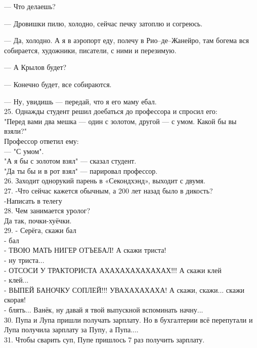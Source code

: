 \documentclass[a4paper,20pt,notitlepage]{extbook}
\begin{document}
	— Что делаешь?
	
	— Дровишки пилю, холодно, сейчас печку затоплю и согреюсь.
	
	— Да, холодно. А я в аэропорт еду, полечу в Рио–де–Жанейро, там богема вся собирается, художники, писатели, с ними и перезимую.
	
	— А Крылов будет?
	
	— Конечно будет, все собираются.
	
	— Ну, увидишь — передай, что я его маму ебал.\\
	
	25.	Однажды студент решил доебаться до профессора и спросил его: \\
	"Перед вами два мешка — один с золотом, другой — с умом. Какой бы вы взяли?"\\
	Профессор ответил ему:\\
	 — "С умом".\\
	"А я бы с золотом взял" — сказал студент.\\
	"Да ты бы и в рот взял" — парировал профессор.\\
	
	26. Заходит однорукий парень в «Секондхэнд», выходит с двумя. \\ 
	
	27. -Что сейчас кажется обычным, а 200 лет назад было в дикость?\\
		-Написать в телегу\\
		
	28. Чем занимается уролог?\\
		Да так, почки-хуёчки.\\
		
	29. - Серёга, скажи бал\\
	- бал\\
	- ТВОЮ МАТЬ НИГЕР ОТЪЕБАЛ! А скажи триста!\\
	- ну триста...\\
	- ОТСОСИ У ТРАКТОРИСТА АХАХАХАХАХАХАХ!!! А скажи клей\\
	- клей...\\
	- ВЫПЕЙ БАНОЧКУ СОПЛЕЙ!!! УВАХАХАХАХА! А скажи, скажи... скажи скорая!\\
	- блять... Ванёк, ну давай я твой выпускной вспоминать начну...\\
	
	30. Пупа и Лупа пришли получать зарплату. Но в бухгалтерии всё перепутали и Лупа получила зарплату за Пупу, а Пупа....\\
	
	31. Чтобы сварить суп, Пупе пришлось 7 раз получить зарплату.\\
	
\end{document}
